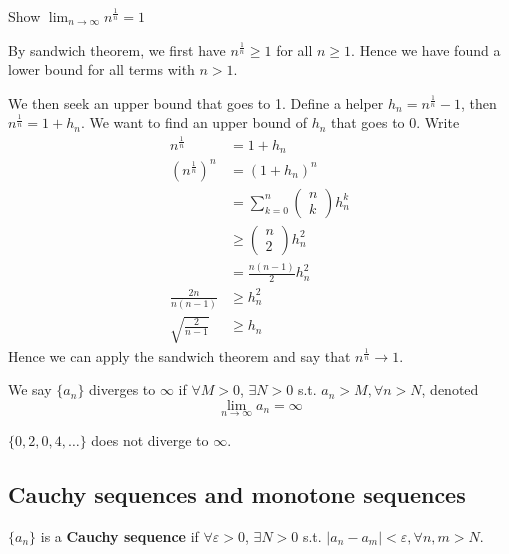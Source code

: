\begin{example}
    Show $\lim_{n \to \infty} n^{ \frac{1}{n}} = 1$ 
    \medskip

    By sandwich theorem, we first have $n^{ \frac{1}{n}} \geq 1$
    for all $n \geq 1$. Hence we have found a lower bound 
    for all terms with $n > 1$.
    \medskip

    We then seek an upper bound that goes to 1. 
    Define a helper $h_n = n^{ \frac{1}{n}} - 1$,
    then $n^{ \frac{1}{n}} = 1 + h_n$. 
    We want to find an upper bound of $h_n$ that 
    goes to 0. 
    Write 
    \begin{align*}
        n^{ \frac{1}{n}} & = 1 + h_n \\
        \left( n^{\frac{1}{n}} \right)^{n} & = (1 + h_n)^n \\
        &= \sum\limits_{k = 0}^{n} 
        \begin{pmatrix} n \\ k \end{pmatrix} 
        h_n^k \\
        & \geq \begin{pmatrix} n \\2 \end{pmatrix} h_n^2 \\
        &= \frac{n(n-1)}{2} h_n^2 \\
        \frac{2n}{n(n-1)} &\geq h_n^2 \\
        \sqrt{ \frac{2}{n-1}} & \geq h_n
    \end{align*}
    Hence we can apply the sandwich theorem and say that 
    $n^{ \frac{1}{n}} \to 1$.
\end{example}

\begin{definition}[Divergence]
    We say $\{ a_n \} $ diverges to $\infty$ if $\forall M > 0$,
    $\exists N > 0$ s.t. $a_n > M, \forall n > N$, denoted 
    \[
        \lim_{n \to \infty} a_n = \infty
    \]
\end{definition}

\begin{example}
    $\{ 0, 2, 0, 4, \hdots \} $ does not diverge to $\infty$.
\end{example}

\subsection{Cauchy sequences and monotone sequences}

\begin{definition}
    $\{ a_n \} $ is a \textbf{Cauchy sequence} if $\forall \varepsilon > 0$, 
    $\exists N > 0$ s.t. $|a_n - a_m| < \varepsilon, \forall n, m > N$.
\end{definition}

